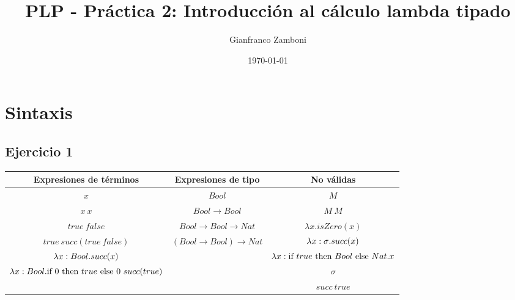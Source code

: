 \documentclass[10pt,a4paper, landscape]{article}
\begin{document}
\title{PLP - Práctica 2: Introducción al cálculo lambda tipado}

\date{\today}

\author{Gianfranco Zamboni}

\maketitle
\setcounter{page}{1}


\section*{\centering Sintaxis}
\subsection{Ejercicio 1}
\begin{multicols}{2}

\end{multicols}

\vspace*{5mm}
\begin{center}
    \begin{tabular}{c|c|c}
        \textbf{Expresiones de términos} & \textbf{Expresiones de tipo} & \textbf{No válidas}\\
        \hline
       $x$ & $ Bool$ & $M$ \\ 
       $x~x$ & $ Bool\to  Bool$ & $M~M$ \\      
       $true~false$ & $ Bool\to  Bool\to  Nat$ & $\lambda x.isZero(x)$ \\
       $true~succ(true~false)$ & $( Bool\to  Bool)\to  Nat$ & ${\lambda x: \sigma \text{.} succ(x)}$\\
       $\lambda x:  Bool \text{.} succ(x)$ & & $\lambda x:\text{if } true \text{ then }  Bool \text{ else }  Nat.x$ \\
       $\lambda x:  Bool \text{.} \text{if } 0 \text{ then } true \text{ else } 0~succ(true)$ & & $\sigma$ \\
       & & $succ~true$
    \end{tabular}
\end{center}
\end{document}
